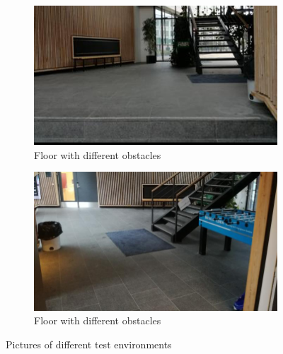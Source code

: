 \begin{figure}[h]
\centering
    \begin{subfigure}{.49\textwidth}
        \centering
        \includegraphics[width=\textwidth]{figures/testarea3.jpg}
        \caption{Floor with different obstacles}
        \label{fig:testsite3} 
    \end{subfigure}
    \begin{subfigure}{.49\textwidth}
        \centering
        \includegraphics[width=\textwidth]{figures/testarea4.jpg} 
        \caption{Floor with different obstacles}
        \label{fig:testsite4}
    \end{subfigure}
\caption{Pictures of different test environments}
\label{fig:testsite34}
\end{figure}

\newpage
